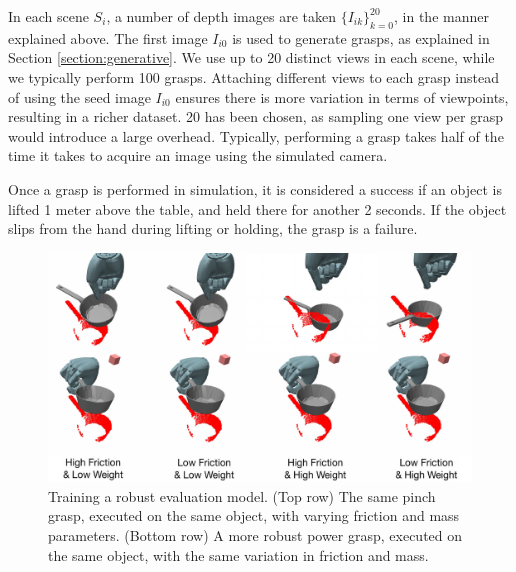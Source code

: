 In each scene $S_i$, a number of depth images are taken $\{I_{ik}\}_{k=0}^20$, in the manner explained above. The first image $I_{i0}$ is used to generate grasps, as explained in Section \ref{section:generative}. We use up to 20 distinct views in each scene, while we typically perform 100 grasps. Attaching different views to each grasp instead of using the seed image $I_{i0}$ ensures there is more variation in terms of viewpoints, resulting in a richer dataset. 20 has been chosen, as sampling one view per grasp would introduce a large overhead. Typically, performing a grasp takes half of the time it takes to acquire an image using the simulated camera.

Once a grasp is performed in simulation, it is considered a success if an object is lifted 1 meter above the table, and held there for another 2 seconds. If the object slips from the hand during lifting or holding, the grasp is a failure. 

\begin{figure}[t]
\includegraphics[width=\columnwidth]{images/frictionweight}
\caption{Training a robust evaluation model. (Top row) The same pinch grasp, executed on the same object, with varying friction and mass parameters. (Bottom row) A more robust power grasp, executed on the same object, with the same variation in friction and mass. \label{fig:evaluative-training}}
\end{figure}


